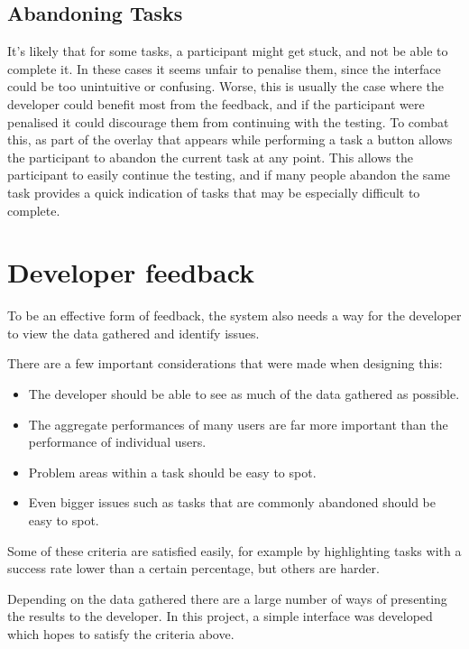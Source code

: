 \subsection{Abandoning Tasks}

It's likely that for some tasks, a participant might get stuck, and not be able
to complete it. In these cases it seems unfair to penalise them, since the
interface could be too unintuitive or confusing. Worse, this is usually the case
where the developer could benefit most from the feedback, and if the participant
were penalised it could discourage them from continuing with the testing. To
combat this, as part of the overlay that appears while performing a task a
button allows the participant to abandon the current task at any point. This allows the participant to easily continue the testing, and if many people abandon the same task provides a quick indication of tasks that may be especially difficult to complete.

\section{Developer feedback}
\label{sec:developer-feedback}

To be an effective form of feedback, the system also needs a way for the developer to view the data gathered and identify issues.

There are a few important considerations that were made when designing this:

\begin{itemize}
  \item The developer should be able to see as much of the data gathered as possible.
  \item The aggregate performances of many users are far more important than the performance of individual users.
  \item Problem areas within a task should be easy to spot.
  \item Even bigger issues such as tasks that are commonly abandoned should be easy to spot.
\end{itemize}

Some of these criteria are satisfied easily, for example by highlighting tasks with a success rate lower than a certain percentage, but others are harder.

Depending on the data gathered there are a large number of ways of presenting the results to the developer. In this project, a simple interface was developed which hopes to satisfy the criteria above.

